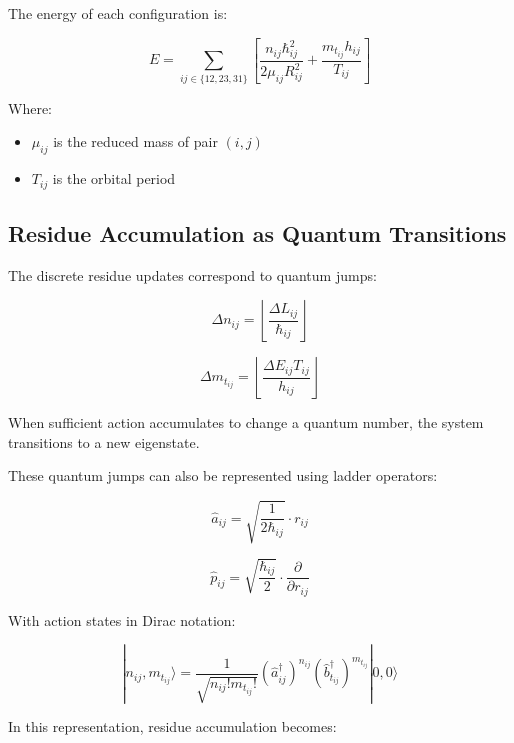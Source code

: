 \documentclass{article}
\begin{document}
The energy of each configuration is:

\begin{equation}
E = \sum_{ij \in \{12,23,31\}} \left[ \frac{n_{ij}\hbar_{ij}^2}{2\mu_{ij}R_{ij}^2} + \frac{m_{t_{ij}}h_{ij}}{T_{ij}} \right]
\end{equation}

Where:
\begin{itemize}
\item $\mu_{ij}$ is the reduced mass of pair $(i,j)$
\item $T_{ij}$ is the orbital period
\end{itemize}

\subsection{Residue Accumulation as Quantum Transitions}

The discrete residue updates correspond to quantum jumps:

\begin{equation}
\Delta n_{ij} = \left\lfloor \frac{\Delta L_{ij}}{\hbar_{ij}} \right\rfloor
\end{equation}

\begin{equation}
\Delta m_{t_{ij}} = \left\lfloor \frac{\Delta E_{ij}T_{ij}}{h_{ij}} \right\rfloor
\end{equation}

When sufficient action accumulates to change a quantum number, the system transitions to a new eigenstate.

These quantum jumps can also be represented using ladder operators:

\begin{equation}
\hat{a}_{ij} = \sqrt{\frac{1}{2\hbar_{ij}}} \cdot r_{ij}
\end{equation}

\begin{equation}
\hat{p}_{ij} = \sqrt{\frac{\hbar_{ij}}{2}} \cdot \frac{\partial}{\partial r_{ij}}
\end{equation}

With action states in Dirac notation:

\begin{equation}
|n_{ij}, m_{t_{ij}}\rangle = \frac{1}{\sqrt{n_{ij}!m_{t_{ij}}!}}(\hat{a}_{ij}^{\dagger})^{n_{ij}}(\hat{b}_{t_{ij}}^{\dagger})^{m_{t_{ij}}}|0,0\rangle
\end{equation}

In this representation, residue accumulation becomes:
\end{document}
